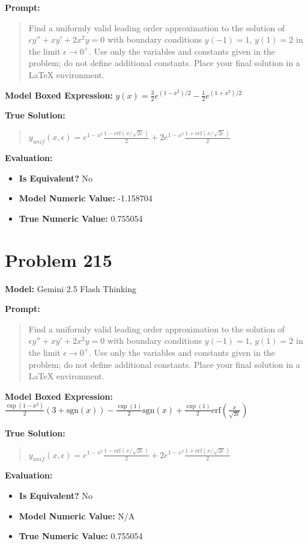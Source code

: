 \documentclass{article}
\begin{document}
{\textbf{Prompt:}
\begin{quote}
Find a uniformly valid leading order approximation to the solution of $\epsilon y'' + x y' + 2x^2 y = 0$ with boundary conditions $y(-1) = 1$, $y(1) = 2$ in the limit $\epsilon \to 0^+$. Use only the variables and constants given in the problem; do not define additional constants. Place your final solution in a $\boxed{}$ LaTeX environment.
\end{quote}
\textbf{Model Boxed Expression:} $y(x) = \frac{3}{2} e^{(1-x^2)/2} - \frac{1}{2} e^{(1+x^2)/2}$

\textbf{True Solution:}
\begin{quote}
$y_{unif}(x, \epsilon) = e^{1-x^2} \frac{1-\text{erf}(x/\sqrt{2\epsilon})}{2} + 2e^{1-x^2} \frac{1+\text{erf}(x/\sqrt{2\epsilon})}{2}$
\end{quote}

\textbf{Evaluation:}
\begin{itemize}
\item \textbf{Is Equivalent?} No
\item \textbf{Model Numeric Value:} -1.158704
\item \textbf{True Numeric Value:} 0.755054
\end{itemize}
\vspace{1cm}
\section*{Problem 215}
\textbf{Model:} Gemini 2.5 Flash Thinking

\textbf{Prompt:}
\begin{quote}
Find a uniformly valid leading order approximation to the solution of $\epsilon y'' + x y' + 2x^2 y = 0$ with boundary conditions $y(-1) = 1$, $y(1) = 2$ in the limit $\epsilon \to 0^+$. Use only the variables and constants given in the problem; do not define additional constants. Place your final solution in a $\boxed{}$ LaTeX environment.
\end{quote}
\textbf{Model Boxed Expression:} $\frac{\exp(1-x^2)}{2}(3+\text{sgn}(x)) - \frac{\exp(1)}{2}\text{sgn}(x) + \frac{\exp(1)}{2}\text{erf}\left(\frac{x}{\sqrt{2\epsilon}}\right)$

\textbf{True Solution:}
\begin{quote}
$y_{unif}(x, \epsilon) = e^{1-x^2} \frac{1-\text{erf}(x/\sqrt{2\epsilon})}{2} + 2e^{1-x^2} \frac{1+\text{erf}(x/\sqrt{2\epsilon})}{2}$
\end{quote}

\textbf{Evaluation:}
\begin{itemize}
\item \textbf{Is Equivalent?} No
\item \textbf{Model Numeric Value:} N/A
\item \textbf{True Numeric Value:} 0.755054
\end{itemize}
\vspace{1cm}
}
\end{document}
